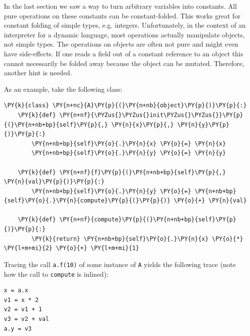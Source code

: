 \documentclass{sig-alternate}
\begin{document}
In the last section we saw a way to turn arbitrary variables into constants. All
pure operations on these constants can be constant-folded. This works great for
constant folding of simple types, e.g. integers. Unfortunately, in the context of an
interpreter for a dynamic
language, most operations actually manipulate objects, not simple types. The
operations on objects are often not pure and might even have side-effects. If
one reads a field out of a constant reference to an object this cannot
necessarily be folded away because the object can be mutated. Therefore, another
hint is needed.

As an example, take the following class:

\begin{Verbatim}[commandchars=\\\{\}]
\PY{k}{class} \PY{n+nc}{A}\PY{p}{(}\PY{n+nb}{object}\PY{p}{)}\PY{p}{:}
    \PY{k}{def} \PY{n+nf}{\PYZus{}\PYZus{}init\PYZus{}\PYZus{}}\PY{p}{(}\PY{n+nb+bp}{self}\PY{p}{,} \PY{n}{x}\PY{p}{,} \PY{n}{y}\PY{p}{)}\PY{p}{:}
        \PY{n+nb+bp}{self}\PY{o}{.}\PY{n}{x} \PY{o}{=} \PY{n}{x}
        \PY{n+nb+bp}{self}\PY{o}{.}\PY{n}{y} \PY{o}{=} \PY{n}{y}

    \PY{k}{def} \PY{n+nf}{f}\PY{p}{(}\PY{n+nb+bp}{self}\PY{p}{,} \PY{n}{val}\PY{p}{)}\PY{p}{:}
        \PY{n+nb+bp}{self}\PY{o}{.}\PY{n}{y} \PY{o}{=} \PY{n+nb+bp}{self}\PY{o}{.}\PY{n}{compute}\PY{p}{(}\PY{p}{)} \PY{o}{+} \PY{n}{val}

    \PY{k}{def} \PY{n+nf}{compute}\PY{p}{(}\PY{n+nb+bp}{self}\PY{p}{)}\PY{p}{:}
        \PY{k}{return} \PY{n+nb+bp}{self}\PY{o}{.}\PY{n}{x} \PY{o}{*} \PY{l+m+mi}{2} \PY{o}{+} \PY{l+m+mi}{1}
\end{Verbatim}

Tracing the call \texttt{a.f(10)} of some instance of \texttt{A} yields the following
trace (note how the call to \texttt{compute} is inlined):
%
\begin{Verbatim}
x = a.x
v1 = x * 2
v2 = v1 + 1
v3 = v2 + val
a.y = v3
\end{Verbatim}
\end{document}
